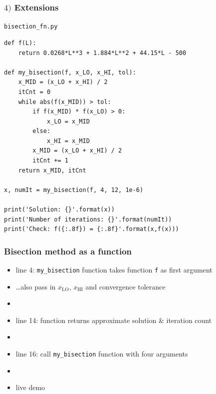 \documentclass[english,14pt]{beamer}
\begin{document}

\begin{frame}[fragile]

\frametitle{$4)$ Extensions}

\texttt{bisection\_fn.py}
\begin{lstlisting}[style=CStyle,basicstyle=\scriptsize]
def f(L):
    return 0.0268*L**3 + 1.884*L**2 + 44.15*L - 500

def my_bisection(f, x_LO, x_HI, tol):
    x_MID = (x_LO + x_HI) / 2
    itCnt = 0
    while abs(f(x_MID)) > tol:
        if f(x_MID) * f(x_LO) > 0:
            x_LO = x_MID
        else:
            x_HI = x_MID
        x_MID = (x_LO + x_HI) / 2
        itCnt += 1
    return x_MID, itCnt

x, numIt = my_bisection(f, 4, 12, 1e-6)

print('Solution: {}'.format(x))
print('Number of iterations: {}'.format(numIt))
print('Check: f({:.8f}) = {:.8f}'.format(x,f(x)))
\end{lstlisting}

\end{frame}


\begin{frame}[fragile]

\frametitle{Bisection method as a function}

\begin{itemize}
	\item line 4: \texttt{my\_bisection} function takes function \texttt{f} as first argument
	\item[] \ldots also pass in $x_\mathrm{LO}$, $x_\mathrm{HI}$ and convergence tolerance
	\item[]
	\item line 14: function returns approximate solution \& iteration count
	\item[]
	\item line 16: call \texttt{my\_bisection} function with four arguments
	\item[]
	\item live demo
\end{itemize}

\end{frame}

\end{document}
